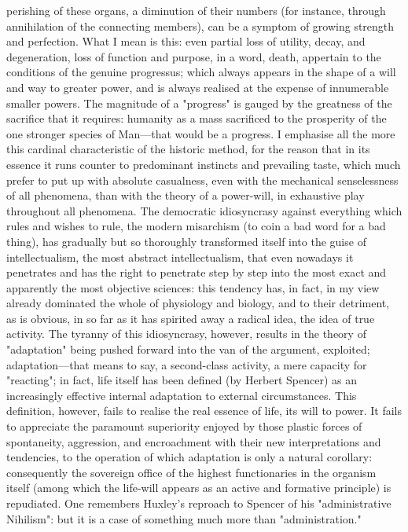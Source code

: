 \documentclass[12pt]{article}
\begin{document}
perishing of these organs, a diminution of their numbers (for instance, through annihilation of the connecting members), can be a symptom of growing strength and perfection. What I mean is this: even partial loss of utility, decay, and degeneration, loss of function and purpose, in a word, death, appertain to the conditions of the genuine progressus; which always appears in the shape of a will and way to greater power, and is always realised at the expense of innumerable smaller powers. The magnitude of a "progress" is gauged by the greatness of the sacrifice that it requires: humanity as a mass sacrificed to the prosperity of the one stronger species of Man---that would be a progress. I emphasise all the more this cardinal characteristic of the historic method, for the reason that in its essence it runs counter to predominant instincts and prevailing taste, which much prefer to put up with absolute casualness, even with the mechanical senselessness of all phenomena, than with the theory of a power-will, in exhaustive play throughout all phenomena. The democratic idiosyncrasy against everything which rules and wishes to rule, the modern misarchism (to coin a bad word for a bad thing), has gradually but so thoroughly transformed itself into the guise of intellectualism, the most abstract intellectualism, that even nowadays it penetrates and has the right to penetrate step by step into the most exact and apparently the most objective sciences: this tendency has, in fact, in my view already dominated the whole of physiology and biology, and to their detriment, as is obvious, in so far as it has spirited away a radical idea, the idea of true activity. The tyranny of this idiosyncrasy, however, results in the theory of "adaptation" being pushed forward into the van of the argument, exploited; adaptation---that means to say, a second-class activity, a mere capacity for "reacting"; in fact, life itself has been defined (by Herbert Spencer) as an increasingly effective internal adaptation to external circumstances. This definition, however, fails to realise the real essence of life, its will to power. It fails to appreciate the paramount superiority enjoyed by those plastic forces of spontaneity, aggression, and encroachment with their new interpretations and tendencies, to the operation of which adaptation is only a natural corollary: consequently the sovereign office of the highest functionaries in the organism itself (among which the life-will appears as an active and formative principle) is repudiated. One remembers Huxley's reproach to Spencer of his "administrative Nihilism": but it is a case of something much more than "administration."
\end{document}
